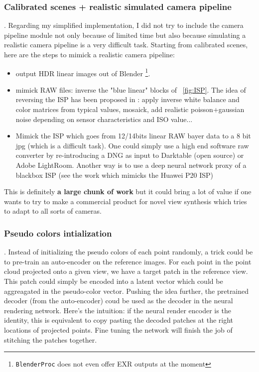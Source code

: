 \subsubsection*{Calibrated scenes + realistic simulated camera pipeline}.
\noindent Regarding my simplified implementation, I did not try to include the camera pipeline module not only because of limited time but also because simulating a realistic camera pipeline is a very difficult task.
Starting from calibrated scenes, here are the steps to mimick a realistic camera pipeline:
\begin{itemize}
    \item output HDR linear images out of Blender \footnote{\texttt{BlenderProc} does not even offer EXR outputs at the moment}.
    \item mimick RAW files: inverse the "blue linear" blocks of ~\cref*{fig:ISP}. The idea of reversing the ISP has been proposed in \cite{brooks2018unprocessing}: apply inverse white balance and color matrices from typical values, mosaick, add realistic poisson+gaussian noise depending on sensor characteristics and ISO value...
    \item Mimick the ISP which goes from 12/14bits linear RAW bayer data to a 8 bit jpg (which is a difficult task). One could simply use a high end software raw converter by re-introducing a DNG as input to Darktable (open source) or Adobe LightRoom. Another way is to use a deep neural network proxy of a blackbox ISP (see the work \cite{ignatov2020replacing} which mimicks the Huawei P20 ISP)
\end{itemize}
This is definitely \textbf{a large chunk of work} but it could bring a lot of value if one wants to try to make a commercial product for novel view synthesis which tries to adapt to all sorts of cameras.

\subsubsection*{Pseudo colors intialization}.
Instead of initializing the pseudo colors of each point randomly, a trick could be to pre-train an auto-encoder on the reference images. For each point in the point cloud projected onto a given view, we have a target patch in the reference view. This patch could simply be encoded into a latent vector which could be aggreagated in the pseudo-color vector. Pushing the idea further, the pretrained decoder (from the auto-encoder) coud be used as the decoder in the neural rendering network. Here's the intuition: if the neural render encoder is the identity, this is equivalent to copy pasting the decoded patches at the right locations of projected points. Fine tuning the network will finish the job of stitching the patches together.

